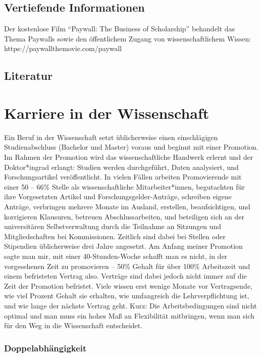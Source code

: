 \documentclass[
  letterpaper,
  DIV=11,
  numbers=noendperiod]{scrreprt}
\begin{document}
\section{Vertiefende Informationen}\label{vertiefende-informationen-1}

Der kostenlose Film ``Paywall: The Business of Scholarship'' behandelt
das Thema Paywalls sowie den öffentlichem Zugang von wissenschaftlichem
Wissen: https://paywallthemovie.com/paywall

\section{Literatur}\label{literatur-8}

\chapter{Karriere in der
Wissenschaft}\label{karriere-in-der-wissenschaft}

Ein Beruf in der Wissenschaft setzt üblicherweise einen einschlägigen
Studienabschluss (Bachelor und Master) voraus und beginnt mit einer
Promotion. Im Rahmen der Promotion wird das wissenschaftliche Handwerk
erlernt und der Doktor*ingrad erlangt: Studien werden durchgeführt,
Daten analysiert, und Forschungsartikel veröffentlicht. In vielen Fällen
arbeiten Promovierende mit einer 50 -- 66\% Stelle als wissenschaftliche
Mitarbeiter*innen, begutachten für ihre Vorgesetzten Artikel und
Forschungsgelder-Anträge, schreiben eigene Anträge, verbringen mehrere
Monate im Ausland, erstellen, beaufsichtigen, und korrigieren Klausuren,
betreuen Abschlussarbeiten, und beteiligen sich an der universitären
Selbstverwaltung durch die Teilnahme an Sitzungen und Mitgliedschaften
bei Kommissionen. Zeitlich sind dabei bei Stellen oder Stipendien
üblicherweise drei Jahre angesetzt. Am Anfang meiner Promotion sagte man
mir, mit einer 40-Stunden-Woche schafft man es nicht, in der
vorgesehenen Zeit zu promovieren -- 50\% Gehalt für über 100\%
Arbeitszeit und einem befristeten Vertrag also. Verträge sind dabei
jedoch nicht immer auf die Zeit der Promotion befristet. Viele wissen
erst wenige Monate vor Vertragsende, wie viel Prozent Gehalt sie
erhalten, wie umfangreich die Lehrverpflichtung ist, und wie lange der
nächste Vertrag geht. Kurz: Die Arbeitsbedingungen sind nicht optimal
und man muss ein hohes Maß an Flexibilität mitbringen, wenn man sich für
den Weg in die Wissenschaft entscheidet.

\subsection{Doppelabhängigkeit}\label{doppelabhuxe4ngigkeit}
\end{document}
